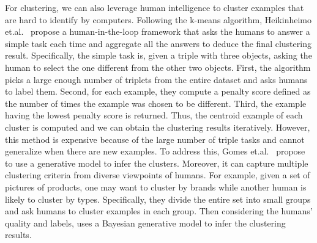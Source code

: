 For clustering, we can also leverage human intelligence to cluster examples that are hard to identify by computers. Following the k-means algorithm,  Heikinheimo et.al.~\cite{DBLP:conf/hcomp/HeikinheimoU13} propose a  human-in-the-loop framework that asks the humans to answer a simple task each time and aggregate all the answers to deduce the final clustering result. Specifically, the simple task is, given a triple with three objects, asking the human to select the one different from the other two objects. First, the algorithm picks a large enough number of triplets from the entire dataset and asks humans to label them. Second, for each example, they compute a penalty score defined as  the number of times the example was chosen to be different. Third, the example having the lowest penalty score is returned. Thus, the centroid example of each cluster is computed and we can obtain the clustering results iteratively. However, this method is expensive because of the large number of triple tasks and cannot generalize when there are new examples. To address this,  Gomes et.al.~\cite{DBLP:conf/nips/GomesWKP11} propose to use a generative  model to infer the clusters. Moreover, it can capture multiple  clustering criteria from diverse viewpoints of humans. For example, given a set of pictures of products, one may want to cluster by brands while another human is likely to cluster by types. Specifically, they divide the entire set into small groups and ask humans to cluster examples in each group. Then considering the humans' quality and labels, \cite{DBLP:conf/nips/GomesWKP11} uses a Bayesian generative model to infer the clustering results.





